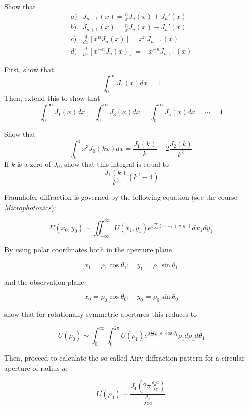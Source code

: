 \begin{sidebar}
\begin{ex}
Show that
$$\begin{array}{lcll}a) & J_{n-1}(x) = \frac{n}{x}J_n(x) + J_n'(x) \\b) & J_{n+1}(x) = \frac{n}{x}J_n(x) - J_n'(x) \\c) & \frac{d}{dx}\left[x^n J_n(x)\right] = x^n J_{n-1}(x) \\d) & \frac{d}{dx}\left[x^{-n} J_n(x)\right] = -x^{-n} J_{n+1}(x)\end{array}$$ \label{ex-recurrence}
\end{ex}
\end{sidebar}


\begin{sidebar}
\begin{ex}
First, show that
$$\int_0^\infty J_1( x) dx =  1$$
Then, extend this to show that
$$\int_0^\infty J_1( x) dx = \int_0^\infty J_3( x) dx = \int_0^\infty J_5( x) dx = \cdots = 1$$
\end{ex}
\end{sidebar}

\begin{sidebar}
\begin{ex}
Show that
$$\int_0^1 x^3 J_0(k x) dx =  \frac{J_1(k)}{k} - 2 \frac{J_2(k)}{k^2}$$
If $k$ is a zero of $J_0$, show that this integral is equal to
$$\frac{J_1(k)}{k^3}\left(k^2-4\right)$$
\end{ex}
\end{sidebar}

\begin{sidebar}
\begin{ex}
Fraunhofer diffraction is governed by the following equation (see the course \emph{Microphotonics}):

$$U(x_0, y_0) \sim \iint_{-\infty}^{\infty} U(x_1, y_1) e ^{j \frac{2\pi}{\lambda z} (x_0 x_1 + y_0 y_1)} dx_1 dy_1  $$

By using polar coordinates both in the aperture plane

$$x_1 = \rho_1 \cos \theta_1; \quad y_1 = \rho_1 \sin \theta_1$$

and the observation plane

$$x_0 = \rho_0 \cos \theta_0; \quad y_0 = \rho_0 \sin \theta_0$$

show that for rotationally symmetric apertures this reduces to

$$U(\rho_0) \sim  \int_0^{\infty} \int_0^{2 \pi} U(\rho_1)  e ^{j \frac{2\pi}{\lambda z} \rho_0 \rho_1 \cos \theta_1} \rho_1 d\rho_1 d\theta_1  $$

Then, proceed to calculate the so-called Airy diffraction pattern for a circular aperture of radius $a$:

$$U(\rho_0) \sim \frac {J_1\left( 2 \pi \frac {\rho_0 a}{\lambda z} \right)}{\frac{\rho_0}{\lambda z a}}$$

\end{ex}
\end{sidebar}

